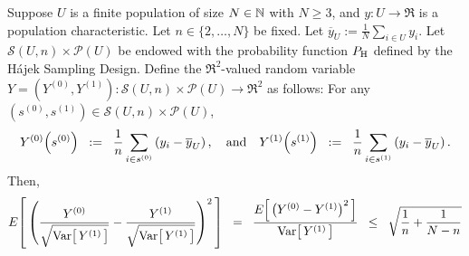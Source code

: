 \begin{theorem}
\label{HajekFundamentalLemma}
\mbox{}
\vskip 0.1cm
\noindent
Suppose $U$ is a finite population of size $N \in \mathbb{N}$ with $N \geq 3$, and $y : U \longrightarrow \Re$ is a population characteristic.
Let $n \in \{2,\ldots,N\}$ be fixed. Let $\overline{y}_{U} := \frac{1}{N}\sum_{i \in U}y_{i}$.
Let $\mathcal{S}(U,n) \times \mathcal{P}(U)$ be endowed with
the probability function $P_{\textnormal{H}}$ defined by the H\'ajek Sampling Design.
Define the $\Re^{2}$-valued random variable
$Y = \left(Y^{(0)}, Y^{(1)}\right) : \mathcal{S}(U,n) \times \mathcal{P}(U) \longrightarrow \Re^{2}$
as follows:
For any $\left(s^{(0)},s^{(1)}\right) \in \mathcal{S}(U,n) \times \mathcal{P}(U)$,
\begin{equation*}
Y^{(0)}\!\left(s^{(0)}\right)
\;\; := \;\;
\dfrac{1}{n}\,\underset{i \in s^{(0)}}{\sum} \left(y_{i} - \overline{y}_{U}\right),
\quad\textnormal{and}\quad
Y^{(1)}\!\left(s^{(1)}\right)
\;\; := \;\;
\dfrac{1}{n}\,\underset{i \in s^{(1)}}{\sum} \left(y_{i} - \overline{y}_{U}\right).
\end{equation*}
Then,
\begin{equation*}
E\!\left[\,\left(
  \dfrac{Y^{(0)}}{\sqrt{\textnormal{Var}\!\left[\,Y^{(1)}\,\right]}}
- \dfrac{Y^{(1)}}{\sqrt{\textnormal{Var}\!\left[\,Y^{(1)}\,\right]}}
\right)^{2}\,\right]
\;\; = \;\;
\dfrac{E\!\left[\,\left(Y^{(0)} - Y^{(1)}\right)^{2}\,\right]}{\textnormal{Var}\!\left[\,Y^{(1)}\,\right]}
\;\; \leq \;\;
\sqrt{\dfrac{1}{n} + \dfrac{1}{N-n}}
\end{equation*}
\end{theorem}

